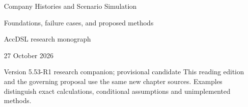 \documentclass[11pt,a4paper]{report}
\begin{document}
\hypersetup{pageanchor=false}
\begin{titlepage}
{\Huge Company Histories and Scenario Simulation\par}
\vspace{12mm}
{\Large Foundations, failure cases, and proposed methods\par}
\vspace{8mm}
AccDSL research monograph\par 27 October 2026\par Version 5.53-R1 research companion; provisional candidate
\vfill
This reading edition and the governing proposal use the same new chapter sources. Examples distinguish exact calculations, conditional assumptions and unimplemented methods.
\end{titlepage}
\hypersetup{pageanchor=true}
\tableofcontents
\clearpage{}


























\clearpage\label{sim:body-end}

\begingroup\raggedright
\endgroup
\end{document}
